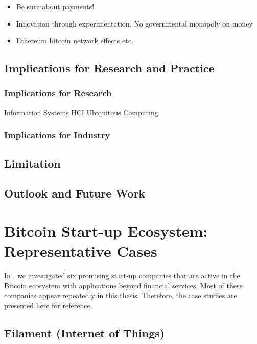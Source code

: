 \begin{itemize}
	\item Be sure about payments!
	\item Innovation through experimentation. No governmental monopoly on money
	\item Ethereum bitcoin network effects etc.
\end{itemize}


\section{Implications for Research and Practice}

\subsection{Implications for Research}

Information Systems
HCI Ubiquitous Computing

\subsection{Implications for Industry}

\section{Limitation}

\section{Outlook and Future Work}




\newpage
\appendix
\chapter{Bitcoin Start-up Ecosystem: Representative Cases}
\label{appendix:cases}

In \parencite{Worner2016ecis}, we investigated six promising start-up companies that are active in the Bitcoin ecosystem with applications beyond financial services. Most of these companies appear repeatedly in this thesis. Therefore, the case studies are presented here for reference.

\section{Filament (Internet of Things)}
\label{sec:ecofilament}

